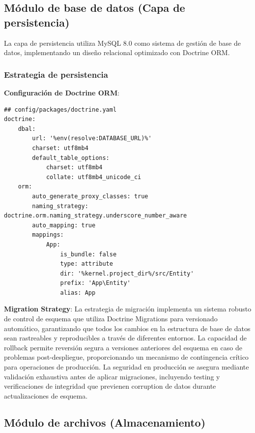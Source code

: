 \documentclass[12pt,a4paper,oneside]{report}
\begin{document}
\subsection{Módulo de base de datos (Capa de
persistencia)}\label{muxf3dulo-de-base-de-datos-capa-de-persistencia}

La capa de persistencia utiliza MySQL 8.0 como sistema de gestión de
base de datos, implementando un diseño relacional optimizado con
Doctrine ORM.

\subsubsection{Estrategia de
persistencia}\label{estrategia-de-persistencia}

\textbf{Configuración de Doctrine ORM}:

\begin{lstlisting}
## config/packages/doctrine.yaml
doctrine:
    dbal:
        url: '%env(resolve:DATABASE_URL)%'
        charset: utf8mb4
        default_table_options:
            charset: utf8mb4
            collate: utf8mb4_unicode_ci
    orm:
        auto_generate_proxy_classes: true
        naming_strategy: doctrine.orm.naming_strategy.underscore_number_aware
        auto_mapping: true
        mappings:
            App:
                is_bundle: false
                type: attribute
                dir: '%kernel.project_dir%/src/Entity'
                prefix: 'App\Entity'
                alias: App
\end{lstlisting}

\textbf{Migration Strategy}: La estrategia de migración implementa un sistema robusto de control de esquema que utiliza Doctrine Migrations para versionado automático, garantizando que todos los cambios en la estructura de base de datos sean rastreables y reproducibles a través de diferentes entornos. La capacidad de rollback permite reversión segura a versiones anteriores del esquema en caso de problemas post-despliegue, proporcionando un mecanismo de contingencia crítico para operaciones de producción. La seguridad en producción se asegura mediante validación exhaustiva antes de aplicar migraciones, incluyendo testing y verificaciones de integridad que previenen corruption de datos durante actualizaciones de esquema.

\subsection{Módulo de archivos
(Almacenamiento)}\label{muxf3dulo-de-archivos-almacenamiento}
\end{document}
